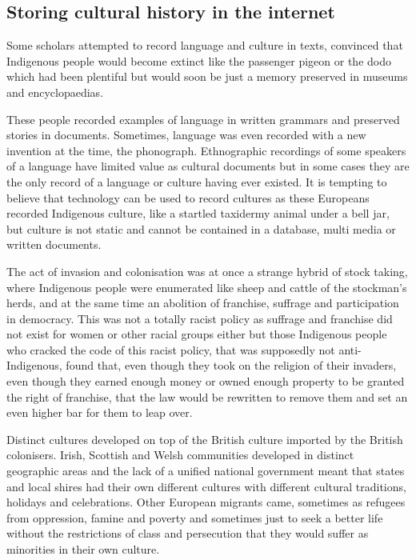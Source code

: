 \subsection{Storing cultural history in the internet}
Some scholars attempted to record language and culture in texts, convinced that Indigenous people would become extinct like the passenger pigeon or the dodo which had been plentiful but would soon be just a memory preserved in museums and encyclopaedias.

These people recorded examples of language in written grammars and preserved stories in documents. Sometimes, language was even recorded with a new invention at the time, the phonograph. Ethnographic recordings of some speakers of a language have limited value as cultural documents but in some cases they are the only record of a language or culture having ever existed. It is tempting to believe that technology can be used to record cultures as these Europeans recorded Indigenous culture, like a startled taxidermy animal under a bell jar, but culture is not static and cannot be contained in a database, multi media or written documents.

 The act of invasion and colonisation was at once a strange hybrid of stock taking, where Indigenous people were enumerated like sheep and cattle of the stockman's herds, and at the same time an abolition of franchise, suffrage and participation in democracy. This was not a totally racist policy as suffrage and franchise did not exist for women or other racial groups either but those Indigenous people who cracked the code of this racist policy, that was supposedly not anti-Indigenous, found that, even though they took on the religion of their invaders, even though they earned enough money or owned enough property to be granted the right of franchise, that the law would be rewritten to remove them and set an even higher bar for them to leap over.

Distinct cultures developed on top of the British culture imported by the British colonisers. Irish, Scottish and Welsh communities developed in distinct geographic areas and the lack of a unified national government meant that states and local shires had their own different cultures with different cultural traditions, holidays and celebrations. Other European migrants came, sometimes as refugees from oppression, famine and poverty and sometimes just to seek a better life without the restrictions of class and persecution that they would suffer as minorities in their own culture.

